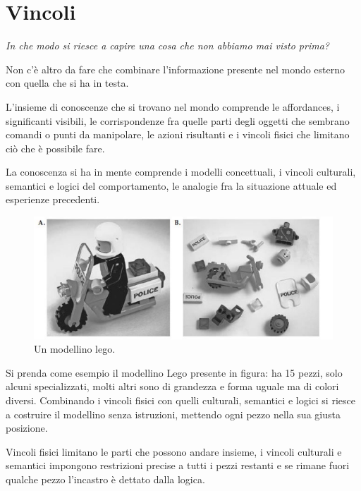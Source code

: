 \section{Vincoli}
\begin{flushleft}
	\textit{In che modo si riesce a capire una cosa che non abbiamo mai visto prima?}
\end{flushleft}

Non c'è altro da fare che combinare l'informazione presente nel mondo esterno con quella che si ha in testa.

L'insieme di conoscenze che si trovano nel mondo comprende le affordances, i significanti visibili, le corrispondenze fra quelle parti degli oggetti che sembrano comandi o punti da manipolare, le azioni risultanti e i vincoli fisici che limitano ciò che è possibile fare.

La conoscenza si ha in mente comprende i modelli concettuali, i vincoli culturali, semantici e logici del comportamento, le analogie fra la situazione attuale ed esperienze precedenti.

\begin{figure}[!h]
	\centering
	\includegraphics[scale = 0.7]{"immagini/Modellino Lego"}
	\caption{Un modellino lego.}
\end{figure}

Si prenda come esempio il modellino Lego presente in figura: ha 15 pezzi, solo alcuni specializzati, molti altri sono di grandezza e forma uguale ma di colori diversi. Combinando i vincoli fisici con quelli culturali, semantici e logici si riesce a costruire il modellino senza istruzioni, mettendo ogni pezzo nella sua giusta posizione.

Vincoli fisici limitano le parti che possono andare insieme, i vincoli culturali e semantici impongono restrizioni precise a tutti i pezzi restanti e se rimane fuori qualche pezzo l'incastro è dettato dalla logica.

